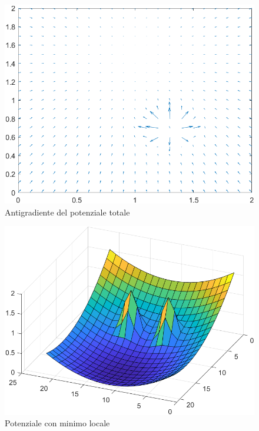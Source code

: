 \documentclass[14pt,twoside,a4paper]{extarticle}
\begin{document}
\begin{figure}[H]
\caption{Antigradiente del potenziale totale}
\label{antigrad}
\includegraphics[width=\textwidth]{antigrad.png}
\end{figure}

\begin{figure}[H]
\caption{Potenziale con minimo locale}
\label{minloc}
\includegraphics[width=\textwidth]{minimoLocale.png}
\end{figure}
\end{document}
